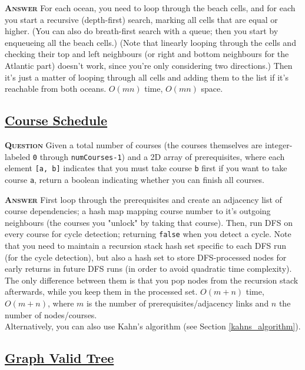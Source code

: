 \documentclass[table, xcdraw]{article}%
\begin{document}
\textsc{\textbf{Answer}} For each ocean, you need to loop through the beach cells, and for each you start a recursive (depth-first) search, marking all cells that are equal or higher. (You can also do breath-first search with a queue; then you start by enqueueing all the beach cells.) (Note that linearly looping through the cells and checking their top and left neighbours (or right and bottom neighbours for the Atlantic part) doesn't work, since you're only considering two directions.) Then it's just a matter of looping through all cells and adding them to the list if it's reachable from both oceans. $O(mn)$ time, $O(mn)$ space.

\subsection{\href{https://leetcode.com/problems/course-schedule}{Course Schedule}}

\textsc{\textbf{Question}} Given a total number of courses (the courses themselves are integer-labeled \texttt{0} through \texttt{numCourses-1}) and a 2D array of prerequisites, where each element \texttt{[a, b]} indicates that you must take course \texttt{b} first if you want to take course \texttt{a}, return a boolean indicating whether you can finish all courses.

\textsc{\textbf{Answer}} First loop through the prerequisites and create an adjacency list of course dependencies; a hash map mapping course number to it's outgoing neighbours (the courses you "unlock" by taking that course). Then, run DFS on every course for cycle detection; returning \texttt{false} when you detect a cycle. Note that you need to maintain a recursion stack hash set specific to each DFS run (for the cycle detection), but also a hash set to store DFS-processed nodes for early returns in future DFS runs (in order to avoid quadratic time complexity). The only difference between them is that you pop nodes from the recursion stack afterwards, while you keep them in the processed set. $O(m+n)$ time, $O(m+n)$, where $m$ is the number of prerequisites/adjacency links and $n$ the number of nodes/courses.\\
Alternatively, you can also use Kahn's algorithm (see Section \ref{kahns_algorithm}).

\subsection{\href{https://leetcode.com/problems/graph-valid-tree}{Graph Valid Tree}}
\end{document}
